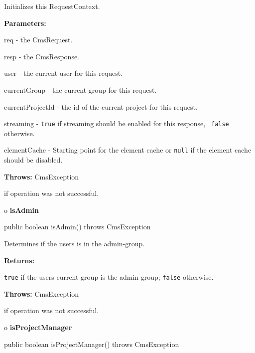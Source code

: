 \begin{description}
\htmlDD Initializes this RequestContext. 

\begin{description}
\item {\bf Parameters:}  

req - the CmsRequest.  

resp - the CmsResponse.  

user - the current user for this request.  

currentGroup - the current group for this request.  

currentProjectId - the id of the current project for this request.  

streaming - {\tt true} if streaming should be enabled for this response, {\tt
false} otherwise.  

elementCache - Starting point for the element cache or {\tt null} if the
element cache should be disabled.  
\item {\bf Throws:} CmsException  

if operation was not successful.  
\end{description}

\end{description}

o {\bf isAdmin} 

\begin{PRE}
 public boolean isAdmin() throws CmsException
\end{PRE}

\begin{description}
\htmlDD Determines if the users is in the admin-group. 

\begin{description}
\item {\bf Returns:}  

{\tt true} if the users current group is the admin-group; {\tt false}
otherwise.  
\item {\bf Throws:} CmsException  

if operation was not successful.  
\end{description}

\end{description}

o {\bf isProjectManager} 

\begin{PRE}
 public boolean isProjectManager() throws CmsException
\end{PRE}


